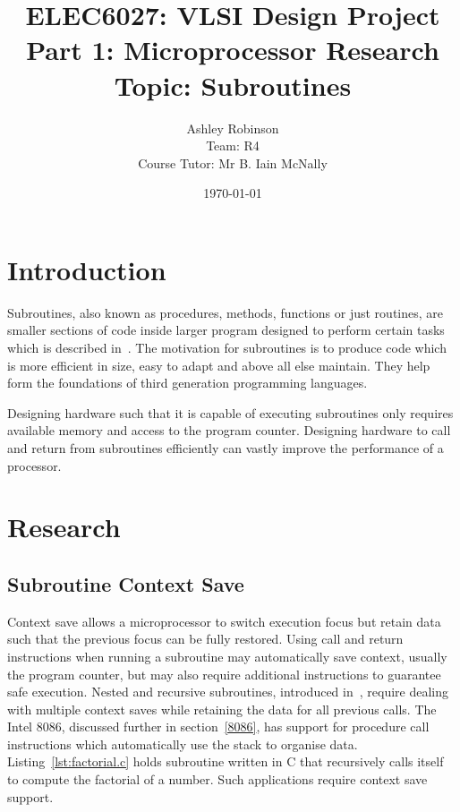 \documentclass[12pt,a4paper]{article}
\title{ELEC6027: VLSI Design Project \\Part 1: Microprocessor Research\\Topic: Subroutines}
\author{Ashley Robinson\\ Team: R4\\Course Tutor: Mr B. Iain McNally}
\date{\today}
\begin{document}
\begin{titlepage}
\clearpage
\maketitle
\thispagestyle{empty}
\end{titlepage}

\tableofcontents
\clearpage

\lstset{
   frame=L,
   basicstyle=\footnotesize,        %
   captionpos=b
}


\section{Introduction}

Subroutines, also known as procedures, methods, functions or just routines, are smaller sections of code inside larger program designed to perform certain tasks which is described in~\cite{alison}.
The motivation for subroutines is to produce code which is more efficient in size, easy to adapt and above all else maintain. 
They help form the foundations of third generation programming languages.

Designing hardware such that it is capable of executing subroutines only requires available memory and access to the program counter.
Designing hardware to call and return from subroutines efficiently can vastly improve the performance of a processor. 


\section{Research}

\subsection{Subroutine Context Save }
Context save allows a microprocessor to switch execution focus but retain data such that the previous focus can be fully restored.
Using call and return instructions when running a subroutine may automatically save context, usually the program counter, but may also require additional instructions to guarantee safe execution.
Nested and recursive subroutines, introduced in~\cite{IainPrograms}, require dealing with multiple context saves while retaining the data for all previous calls. 
The Intel 8086, discussed further in section~\ref{8086}, has support for procedure call instructions which automatically use the stack to organise data.
Listing~\ref{lst:factorial.c} holds subroutine written in C that recursively calls itself to compute the factorial of a number.
Such applications require context save support.
\end{document}
